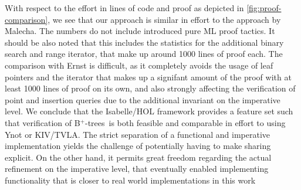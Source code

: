 \documentclass[a4paper,UKenglish,cleveref, autoref, thm-restate]{lipics-v2021}
\newcommand{\btrees}{B$^+$-trees}
\begin{document}
With respect to the effort in lines of code and proof
as depicted in \autoref{fig:proof-comparison}, we see
that our approach is similar in effort to the approach by Malecha.
The numbers do not include introduced pure ML proof tactics.
It should be also noted that this includes the statistics
for the additional binary search and range iterator,
that make up around 1000 lines of proof each.
The comparison with Ernst is difficult, as it completely
avoids the usage of leaf pointers and the iterator
that makes up a signifant amount of the proof
with at least 1000 lines of proof on its own, and also
strongly affecting the verification of point and insertion queries
due to the additional invariant on the imperative level.
We conclude that the Isabelle/HOL framework
provides a feature set
such that verification of \btrees\ is both feasible
and comparable in effort to using Ynot or KIV/TVLA.
The strict separation of a functional and imperative
implementation yields the challenge
of potentially having to make sharing explicit.
On the other hand, it permits great freedom
regarding the actual refinement on the imperative level,
that eventually enabled
implementing functionality that is closer
to real world implementations in this work
\end{document}
